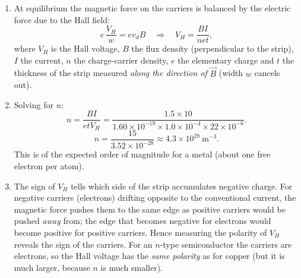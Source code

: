 \documentclass[11pt]{article}
\newcounter{popsec}
\newcounter{popsub}
\newcommand{\courssub}[1]{%
  \stepcounter{popsub}%
  \par\vspace{9pt}\noindent{\popxbold\fontsize{11.5}{13}\selectfont\color{popink}{\color{poporange}\thepopsec.\thepopsub}\hspace{6pt}#1}\par\nopagebreak\vspace{4pt}
}
\begin{document}
\begin{corrige}
\begin{enumerate}
\item At equilibrium the magnetic force on the carriers is balanced by the electric force due to the Hall field:
\[ e\,\frac{V_H}{w} = e v_d B \quad\Longrightarrow\quad V_H = \frac{B I}{n e t}, \]
where $V_H$ is the Hall voltage, $B$ the flux density (perpendicular to the strip), $I$ the current, $n$ the charge-carrier density, $e$ the elementary charge and $t$ the thickness of the strip measured \emph{along the direction of} $\vec{B}$ (width $w$ cancels out).
\item Solving for $n$:
\[ n = \frac{B I}{e t V_H} = \frac{1.5 \times 10}{1.60 \times 10^{-19} \times 1.0 \times 10^{-4} \times 22 \times 10^{-6}}. \]
\[ n = \frac{15}{3.52 \times 10^{-28}} \approx 4.3 \times 10^{28}\ \mathrm{m^{-3}}. \]
This is of the expected order of magnitude for a metal (about one free electron per atom).
\item The sign of $V_H$ tells which side of the strip accumulates negative charge. For negative carriers (electrons) drifting opposite to the conventional current, the magnetic force pushes them to the same edge as positive carriers would be pushed \emph{away} from; the edge that becomes negative for electrons would become positive for positive carriers. Hence measuring the polarity of $V_H$ reveals the sign of the carriers. For an $n$-type semiconductor the carriers are electrons, so the Hall voltage has the \emph{same polarity} as for copper (but it is much larger, because $n$ is much smaller).
\end{enumerate}
\end{corrige}

\courssub{I prepare for the GCE}
\end{document}
